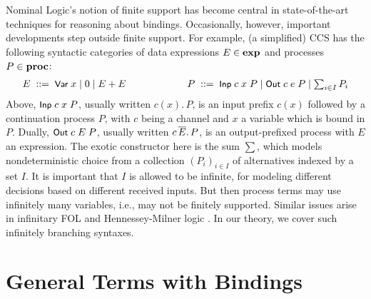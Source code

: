 \documentclass{llncs}
\begin{document}
Nominal Logic's \cite{pitts01nominal,UrbanTasson} 
notion of finite support %
has become central in state-of-the-art techniques for reasoning about bindings. 
Occasionally, however, important developments 
step outside finite support. For example, 
(a simplified) %
CCS \cite{MilCCSBook} has the following syntactic categories 
of data expressions $E \in \mbox{\bf exp}$ and processes $P \in \mbox{\bf proc}$: 
%
$$
\begin{array}{cc}
E    \;::=\; \Var\;x \mid 0 \mid E + E
\hspace*{6ex}
&
\hspace*{6ex}
P    \;::=\; \Inp\;c\;x\;P \mid \Out\;c\;e\;P \mid %
\sum_{i\in I}P_i 
\end{array}   
$$
%
Above, $\mbox{\rm\textsf{\small Inp}}\;c\;x\;P$, usually written $c(x).\,P$, is an input prefix $c(x)$ followed by a 
continuation process $P$, with $c$ being a channel %
and $x$ a variable which is bound in $P$. Dually, 
$\mbox{\rm\textsf{\small Out}}\;c\;E\;P$, usually written $c\,\overline{E}.\,P$, is an output-prefixed process
with $E$ an expression. %
The exotic constructor here is the sum $\sum$, which models nondeterministic choice from a collection $(P_i)_{i \in I}$ of 
alternatives indexed by a set $I$. It is important that $I$ is allowed to be infinite, 
for modeling 
different decisions based on different received inputs. 
But then process terms may use infinitely many variables, i.e., may not be finitely supported.  
Similar issues %
arise %
in infinitary FOL \cite{kei-mod} and Hennessey-Milner logic \cite{henessy-milner-logic}. 
%
In our theory, we cover such %
infinitely branching syntaxes.  








\section%
{General Terms with Bindings}
\label{GenSet}
\end{document}
